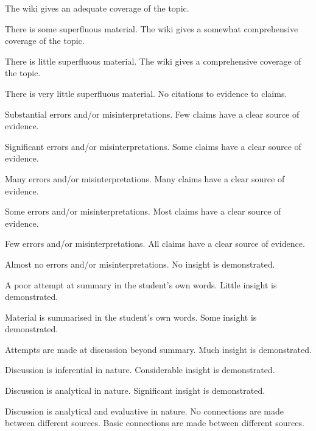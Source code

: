 \documentclass{../../fal_assignment}
\begin{document}
\begin{markingrubric}
        \grade 		The wiki gives an adequate coverage of the topic.
				\par			There is some superfluous material.
        \grade 		The wiki gives a somewhat comprehensive coverage of the topic.
				\par			There is little superfluous material.
        \grade 		The wiki gives a comprehensive coverage of the topic.
				\par			There is very little superfluous material.
%
        \grade\fail 	No citations to evidence to claims.
        \par 		Substantial errors and/or misinterpretations.
        \grade 		Few claims have a clear source of evidence.
        \par 		Significant errors and/or misinterpretations.
        \grade 		Some claims have a clear source of evidence.
        \par 		Many errors and/or misinterpretations.
        \grade 		Many claims have a clear source of evidence.
        \par 		Some errors and/or misinterpretations.
        \grade 		Most claims have a clear source of evidence.
        \par 		Few errors and/or misinterpretations.
        \grade 		All claims have a clear source of evidence.
        \par 		Almost no errors and/or misinterpretations.
%
        \grade\fail No insight is demonstrated.
        \par		A poor attempt at summary in the student's own words.
        \grade		Little insight is demonstrated.
        \par		Material is summarised in the student's own words.
        \grade		Some insight is demonstrated.
        \par		Attempts are made at discussion beyond summary.
        \grade		Much insight is demonstrated.
        \par		Discussion is inferential in nature.
        \grade		Considerable insight is demonstrated.
        \par		Discussion is analytical in nature.
        \grade		Significant insight is demonstrated.
        \par		Discussion is analytical and evaluative in nature.
%
        \grade\fail No connections are made between different sources.
        \grade		Basic connections are made between different sources.

\end{markingrubric}
\end{document}
